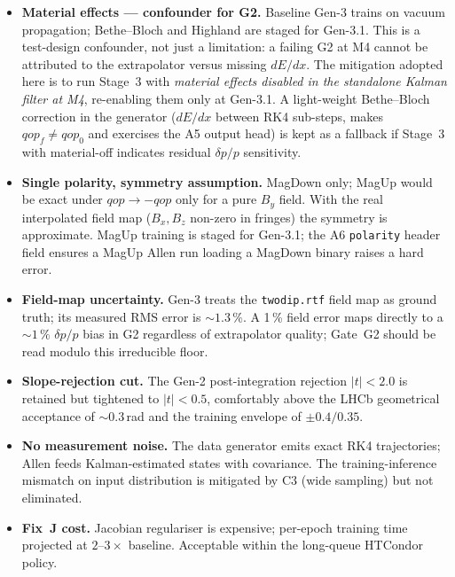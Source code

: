 \documentclass[a4paper,11pt]{article}
\begin{document}
\begin{itemize}
  \item \textbf{Material effects --- confounder for G2.}  Baseline
        Gen-3 trains on vacuum propagation; Bethe--Bloch and
        Highland are staged for Gen-3.1.  This is a test-design
        confounder, not just a limitation: a failing G2 at M4 cannot
        be attributed to the extrapolator versus missing $dE/dx$.
        The mitigation adopted here is to run Stage~3 with
        \emph{material effects disabled in the standalone Kalman
        filter at M4}, re-enabling them only at Gen-3.1.  A
        light-weight Bethe--Bloch correction in the generator
        ($dE/dx$ between RK4 sub-steps, makes $qop_f\ne qop_0$ and
        exercises the A5 output head) is kept as a fallback if
        Stage~3 with material-off indicates residual $\delta p/p$
        sensitivity.
  \item \textbf{Single polarity, symmetry assumption.}  MagDown
        only; MagUp would be exact under $qop\to-qop$ only for a
        pure $B_y$ field.  With the real interpolated field map
        ($B_x,B_z$ non-zero in fringes) the symmetry is approximate.
        MagUp training is staged for Gen-3.1; the A6 \texttt{polarity}
        header field ensures a MagUp Allen run loading a MagDown
        binary raises a hard error.
  \item \textbf{Field-map uncertainty.}  Gen-3 treats the
        \texttt{twodip.rtf} field map as ground truth; its measured
        RMS error is ${\sim}1.3\,\%$.  A 1\,\% field error maps
        directly to a $\sim 1\,\%$ $\delta p/p$ bias in G2
        regardless of extrapolator quality; Gate~G2 should be read
        modulo this irreducible floor.
  \item \textbf{Slope-rejection cut.}  The Gen-2
        post-integration rejection $|t|<2.0$ is retained but
        tightened to $|t|<0.5$, comfortably above the LHCb
        geometrical acceptance of ${\sim}0.3$\,rad and the training
        envelope of $\pm 0.4/0.35$.
  \item \textbf{No measurement noise.}  The data generator emits
        exact RK4 trajectories; Allen feeds Kalman-estimated
        states with covariance.  The training-inference mismatch
        on input distribution is mitigated by C3 (wide sampling) but
        not eliminated.
  \item \textbf{Fix~J cost.} Jacobian regulariser is expensive;
        per-epoch training time projected at $2\text{--}3\times$
        baseline.  Acceptable within the long-queue HTCondor
        policy.
\end{itemize}
\end{document}
